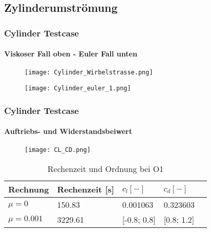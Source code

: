 \documentclass[
	11pt, %
	aspectratio=169, %
]{beamer}
\begin{document}
\subsection{Zylinderumströmung}
\begin{frame}
\frametitle{Cylinder Testcase}
\framesubtitle{Viskoser Fall oben - Euler Fall unten}
\vspace*{-0.2cm}
\begin{figure}
	\texttt{[image: Cylinder\_Wirbelstrasse.png]}
\end{figure}
\vspace*{-0.5cm}
\begin{figure}
	\texttt{[image: Cylinder\_euler\_1.png]}
\end{figure}



\end{frame}
\begin{frame}
	\frametitle{Cylinder Testcase}
	\framesubtitle{Auftriebs- und Widerstandsbeiwert}

	\begin{figure}
		\texttt{[image: CL\_CD.png]}
	\end{figure}


	\begin{table}
		\begin{tabular}{l l l l l}
			\toprule
			Rechnung & Rechenzeit [s]& $c_l [-]$  & $c_d [-]$\\
			\midrule
			$\mu = 0$ & 150.83 & 0.001063 & 0.323603\\
			$\mu = 0.001$& 3229.61 & [-0.8; 0.8] & [0.8; 1.2]\\
			\bottomrule
		\end{tabular}
		\caption{Rechenzeit und Ordnung bei O1}
	\end{table}
\end{frame}
\end{document}
